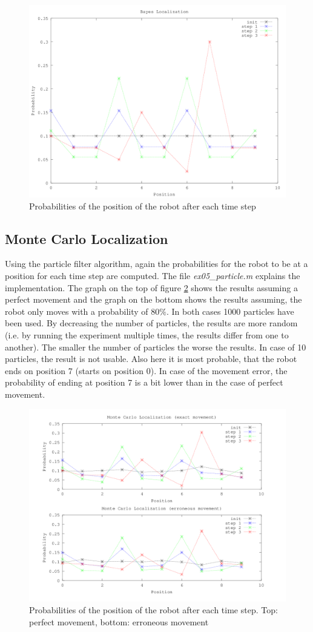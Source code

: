 \documentclass[paper=a4, fontsize=11pt]{scrartcl} %
\begin{document}
\begin{figure}[h]
    \includegraphics[width=1\columnwidth]{ex05_graph1}
    \caption{Probabilities of the position of the robot after each time step}
    \label{fig:bayes}
\end{figure}

\subsection{Monte Carlo Localization}
Using the particle filter algorithm, again the probabilities for the robot to
be at a position for each time step are computed. The file
\emph{ex05\_particle.m} explains the implementation. The graph on the top of
figure \ref{fig:particle} shows the results assuming a perfect movement and the
graph on the bottom shows the results assuming, the robot only moves with
a probability of $ 80\% $. In both cases 1000 particles have been used. By
decreasing the number of particles, the results are more random (i.e. by
running the experiment multiple times, the results differ from one to another).
The smaller the number of particles the worse the results. In case of 10
particles, the result is not usable. Also here it is most probable, that the
robot ends on position 7 (starts on position 0). In case of the movement error,
the probability of ending at position 7 is a bit lower than in the case of
perfect movement.

\begin{figure}[h]
    \includegraphics[width=1\columnwidth]{ex05_graph2}
    \caption{Probabilities of the position of the robot after each time step.
        Top: perfect movement, bottom: erroneous movement}
    \label{fig:particle}
\end{figure}
\end{document}

